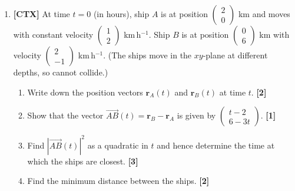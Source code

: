 \documentclass[11pt,a4paper]{article}
\begin{document}
\begin{enumerate}[resume]
\begin{center}
\end{center}

\item \textbf{[CTX]} At time $t = 0$ (in hours), ship $A$ is at position $\begin{pmatrix} 2 \\ 0 \end{pmatrix}$ km and moves with constant velocity $\begin{pmatrix} 1 \\ 2 \end{pmatrix}$ km\,h$^{-1}$. Ship $B$ is at position $\begin{pmatrix} 0 \\ 6 \end{pmatrix}$ km with velocity $\begin{pmatrix} 2 \\ -1 \end{pmatrix}$ km\,h$^{-1}$. (The ships move in the $xy$-plane at different depths, so cannot collide.)
\begin{enumerate}
  \item Write down the position vectors $\mathbf{r}_A(t)$ and $\mathbf{r}_B(t)$ at time $t$. \hfill{\small\textbf{[2]}}
  \item Show that the vector $\overrightarrow{AB}(t) = \mathbf{r}_B - \mathbf{r}_A$ is given by $\begin{pmatrix} t-2 \\ 6-3t \end{pmatrix}$. \hfill{\small\textbf{[1]}}
  \item Find $|\overrightarrow{AB}(t)|^2$ as a quadratic in $t$ and hence determine the time at which the ships are closest. \hfill{\small\textbf{[3]}}
  \item Find the minimum distance between the ships. \hfill{\small\textbf{[2]}}
\end{enumerate}


\end{enumerate}
\end{document}
